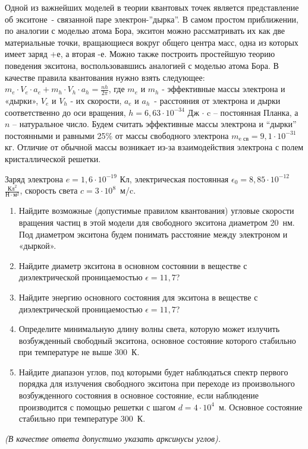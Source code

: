 
Одной из важнейших моделей в теории квантовых точек является представление об экситоне~- 
связанной паре электрон-”дырка”. В самом простом приближении, по аналогии с моделью атома Бора, 
экситон можно рассматривать их как две материальные точки, вращающиеся вокруг общего центра масс, 
одна из которых имеет заряд +е, а вторая -е. Можно также построить простейшую теорию поведения экситона, 
воспользовавшись аналогией с моделью атома Бора. В качестве правила квантования нужно взять следующее: 
${m_e \cdot V_e \cdot a_e + m_h \cdot V_h \cdot a_h=\frac{nh}{2 \pi}}$, где $m_e$ и $m_h$  - эффективные массы электрона 
и «дырки», $V_e$ и $V_h$ - их скорости, $a_e$ и $a_h$~- расстояния от электрона и дырки соответственно 
до оси вращения, $h=6,63 \cdot 10^{-34}$  Дж $\cdot$ c – постоянная Планка, а $n$  – натуральное число. 
Будем считать эффективные массы электрона и “дырки” постоянными и равными 25\% от массы свободного электрона 
$m_{\text{e св}}=9,1 \cdot 10^{-31}$кг. Отличие от обычной массы возникает из-за взаимодействия электрона с полем кристаллической решетки.

Заряд электрона $e=1,6 \cdot 10^{-19}$ Кл, электрическая постоянная $\epsilon_0=8,85 \cdot 10^{-12}$  $\frac{\text{Кл}^2}{\text{Н} \cdot \text{м}^2}$, скорость 
света $c = 3 \cdot 10^8$~м/c.

\begin{enumerate}
    \item Найдите возможные (допустимые правилом квантования) угловые скорости вращения частиц в этой 
    модели для свободного экситона диаметром 20~нм. Под диаметром экситона будем понимать расстояние 
    между электроном и «дыркой».
    \item Найдите диаметр экситона в основном состоянии в веществе с диэлектрической проницаемостью $\epsilon=11,7$?
    \item Найдите энергию основного состояния для экситона в веществе с диэлектрической проницаемостью $\epsilon=11,7$?
    \item Определите минимальную длину волны света, которую может излучить возбужденный свободный экситона, основное состояние которого стабильно при температуре не выше 300~К.
    \item Найдите диапазон углов, под которыми будет наблюдаться спектр первого порядка для излучения свободного экситона при переходе из произвольного возбужденного состояния в основное состояние, если наблюдение производится с помощью решетки с шагом $d= 4 \cdot 10^4$~м. 
    Основное состояние стабильно при температуре 300~К.    
\end{enumerate}

\textit{(В качестве ответа допустимо указать арксинусы углов).}